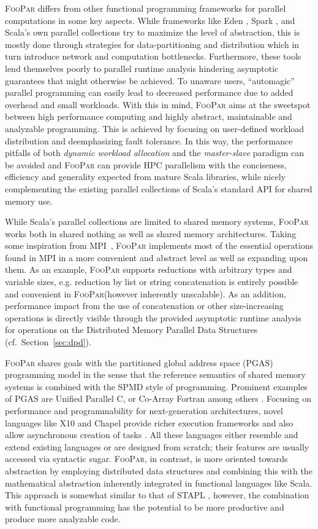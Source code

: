 \documentclass{article}
\newcommand{\framework}{{\rmfamily\scshape FooPar}\xspace}
\begin{document}
{\framework differs from other functional programming frameworks for parallel computations in some key aspects. While frameworks like Eden \cite{eden05}, Spark \cite{spark10}, and Scala's own parallel collections \cite{odersky11} try to maximize the level of abstraction, 
this is mostly done through strategies for data-partitioning and distribution which in turn introduce network and computation bottlenecks. Furthermore, these tools lend themselves poorly to parallel runtime analysis hindering 
asymptotic guarantees that might otherwise be achieved. To unaware users, ``automagic'' parallel programming can easily lead to decreased performance due to added overhead and small workloads. With this in mind, 
\framework aims at the sweetspot between high performance computing and highly abstract, maintainable and analyzable programming. This is achieved
by focusing on user-defined workload distribution and deemphasizing fault tolerance. In this way, the performance pitfalls of both \emph{dynamic workload allocation} and the \emph{master-slave} paradigm can be avoided
and \framework can provide HPC parallelism with the conciseness, efficiency and generality expected from mature Scala libraries, while nicely complementing the existing parallel collections of
Scala's standard API for shared memory use.

While Scala's parallel collections are limited to shared memory systems, \framework works both in shared nothing as well as shared memory architectures. Taking some inspiration from MPI~\cite{gabriel04}, \framework implements 
most of the essential operations found in MPI in a more convenient and abstract level as well as expanding upon them. As an example, \framework supports reductions with arbitrary types and variable sizes, e.g. reduction 
by list or string concatenation is entirely possible and convenient in \framework (however inherently unscalable). As an addition, performance impact from the use of concatenation or other size-increasing operations is directly visible through the 
provided asymptotic runtime analysis for operations on the Distributed Memory Parallel Data Structures (cf.\ Section~\ref{sec:dpd}). 

\framework shares goals with the partitioned global address space (PGAS) programming model in the sense that the reference semantics of shared memory systems is combined with the SPMD style of programming. Prominent examples of PGAS are Unified Parallel C, or Co-Array Fortran among others \cite{pgas05}. Focusing on performance and programmability for next-generation architectures, novel languages like X10 and Chapel provide richer execution frameworks and also allow asynchronous creation of tasks \cite{apgas07}. All these languages either resemble and extend existing languages or are designed from scratch; their features are usually accessed via syntactic sugar.
\framework, in contrast, is more oriented towards abstraction by employing distributed data structures and combining this with the mathematical abstraction inherently integrated in functional languages like Scala. This approach 
is somewhat similar to that of STAPL \cite{rauchwerger10}, however, the combination with functional programming has the potential to be more productive and produce more analyzable code.

}
\end{document}
